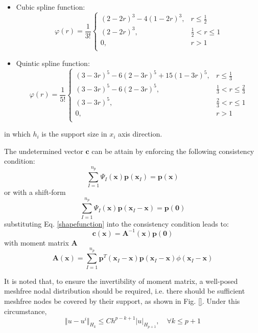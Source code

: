 \documentclass{article}
\begin{document}
\begin{itemize}
    \item Cubic spline function:
\begin{equation}
    \varphi(r) = \frac{1}{3!}
    \begin{cases}
        (2-2r)^3 - 4(1-2r)^3, & r\le\frac{1}{2} \\
        (2-2r)^3, & \frac{1}{2}<r\le 1 \\
        0, & r> 1 \\
    \end{cases}
\end{equation}
    \item Quintic spline function:
\begin{equation}
    \varphi(r) = \frac{1}{5!}
    \begin{cases}
        (3-3r)^5 - 6(2-3r)^5 + 15(1-3r)^5, & r\le\frac{1}{3} \\
        (3-3r)^5 - 6(2-3r)^5, & \frac{1}{3}<r\le\frac{2}{3} \\
        (3-3r)^5, & \frac{2}{3}<r\le 1 \\
        0, & r> 1 \\
    \end{cases}
\end{equation}
\end{itemize}
in which $h_i$ is the support size in $x_i$ axis direction. \par
The undetermined vector $\boldsymbol c$ can be attain by enforcing the following consistency condition:
\begin{equation}
    \sum_{I=1}^{n_p} \Psi_I(\boldsymbol x) \boldsymbol p(\boldsymbol x_I) = \boldsymbol p(\boldsymbol x)
\end{equation}
or with a shift-form
\begin{equation}
    \sum_{I=1}^{n_p} \Psi_I(\boldsymbol x) \boldsymbol p(\boldsymbol x_I - \boldsymbol x) = \boldsymbol p(\boldsymbol 0)
\end{equation}
substituting Eq. \ref{shapefunction} into the consistency condition leads to:
\begin{equation}
    \boldsymbol c(\boldsymbol x) = \boldsymbol A^{-1}(\boldsymbol x) \boldsymbol p(\boldsymbol 0)
\end{equation}
with moment matrix $\boldsymbol A$
\begin{equation}
    \boldsymbol A(\boldsymbol x) = \sum_{I=1}^{n_p}\boldsymbol p^T(\boldsymbol x_I - \boldsymbol x)\boldsymbol p(\boldsymbol x_I - \boldsymbol x)\phi(\boldsymbol x_I - \boldsymbol x)
\end{equation}\par
It is noted that, to ensure the invertibility of moment matrix, a well-posed meshfree nodal distribution should be required, i.e. there should be sufficient meshfree nodes be covered by their support, as shown in Fig. \ref{}. Under this circumstance,
\begin{equation}
\Vert u - u^i \Vert_{H_k} \le Ch^{p-k+1} \vert u \vert_{H_{p+1}}, \quad \forall k \le p+1
\end{equation}
\end{document}
